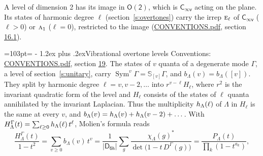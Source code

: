 \documentclass[10pt,a4paper]{article}
\makeatletter
\renewcommand\section{\@startsection{section}{1}{\z@}{-3ex plus -1ex minus -.2ex}%
  {1.2ex plus .2ex}{\normalfont\large\sffamily\bfseries\color{parttitle}}}
\newcommand{\needspace}[1]{\par\penalty-100\begingroup\dimen0=#1\relax\dimen2=\pagegoal
  \advance\dimen2-\pagetotal\ifdim\dimen0>\dimen2\relax\ifdim\dimen2>0pt\vfil\break\fi\fi
  \endgroup}
\numberwithin{equation}{section}
\newcommand{\grp}[1]{\mathsf{#1}}
\newcommand{\irr}[1]{\text{\normalfont\scshape #1}}
\newcommand{\repD}[1]{D^{#1}}
\newcommand{\irchar}[1]{\chi_{#1}}
\newcommand{\conj}[1]{{#1}^{*}}
\newcommand{\schur}[1]{\mathbb{S}_{#1}}
\newcommand{\shape}[1]{[#1]}
\makeatother
\begin{document}
A level of dimension 2 has its image in $\grp{O(2)}$, which is \href{Cinfv.pdf}{$\grp{C_{\infty v}}$} acting on the plane. \label{n:index.harmonic.degree}Its states of harmonic degree $\ell$ (section~\ref{s:overtones}) carry the irrep $\irr{e}_{\ell}$ of \href{Cinfv.pdf}{$\grp{C_{\infty v}}$} ($\ell > 0$) or $\irr{a}_{1}$ ($\ell = 0$), restricted to the image (\href{../../CONVENTIONS.pdf}{CONVENTIONS.pdf}, section \href{../../CONVENTIONS.pdf\#conv.16.1}{16.1}).
\needspace{103pt}
\section{Vibrational overtone levels}\label{s:overtones}
Conventions: \href{../../CONVENTIONS.pdf}{CONVENTIONS.pdf}, section \href{../../CONVENTIONS.pdf\#conv.19}{19}.
\leavevmode\label{n:index.quanta}\label{n:operator.symmetric.power}The states of $v$ quanta of a degenerate mode $\Gamma$, a level of section~\ref{s:unitary}, carry $\operatorname{Sym}^{v}\Gamma = \schur{\shape{v}}\Gamma$, and $b_\Lambda(v) = b_\Lambda(\shape{v})$. \label{n:local.quadratic.form}\label{n:set.harmonic}They split by harmonic degree $\ell = v, v - 2, \dots$ into $r^{v-\ell}H_\ell$, where $r^2$ is the invariant quadratic form of the level and $H_\ell$ consists of the states of $\ell$ quanta annihilated by the invariant Laplacian. \label{n:function.multiplicity.harmonic}Thus the multiplicity $\mathnormal{h}_\Lambda(\ell)$ of $\Lambda$ in $H_\ell$ is the same at every $v$, and $b_\Lambda(v) = \mathnormal{h}_\Lambda(v) + \mathnormal{h}_\Lambda(v - 2) + \dots$. \label{n:function.generating.level}With $H^{\Gamma}_\Lambda(t) = \sum_{\ell\ge0} \mathnormal{h}_\Lambda(\ell)\,t^{\ell}$, Molien's formula reads
\begin{equation}\label{e:molien}\frac{H^{\Gamma}_\Lambda(t)}{1 - t^2} = \sum_{v\ge0} b_\Lambda(v)\,t^v = \frac{1}{|\grp{D_{6h}}|}\sum_{g}\frac{\conj{\irchar{\Lambda}(g)}}{\det\bigl(1 - t\,\repD{\Gamma}(g)\bigr)} = \frac{P_\Lambda(t)}{\prod_k (1-t^{a_k})},\end{equation}
\end{document}

